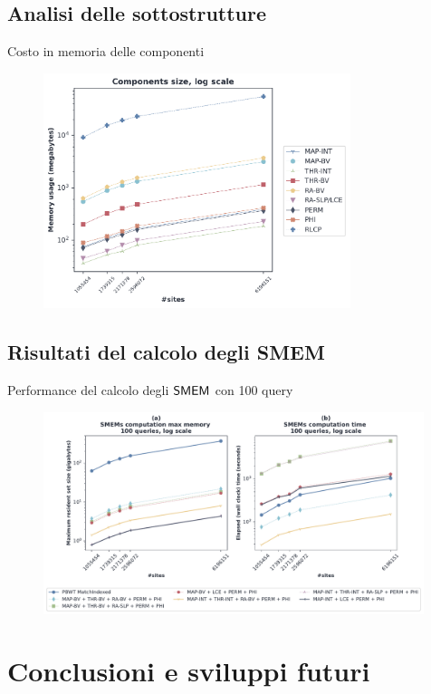 \documentclass[]{beamer}
\def\SMEM{\mbox{\rm {\sf SMEM}}}
\begin{document}
\subsection{Analisi delle sottostrutture}
\begin{frame}{Costo in memoria delle componenti}
  \begin{figure}[H]
    \centering
    \includegraphics[width=0.8\textwidth]{img/comp_mem22.pdf}
  \end{figure}
\end{frame}
\subsection{Risultati del calcolo degli SMEM}
\begin{frame}{Performance del calcolo degli $\SMEM$ con 100 query}
  \begin{figure}[H]
    \centering
    \includegraphics[width=0.99\textwidth]{img/exe_time_mem_paper2.pdf}
  \end{figure}
\end{frame}

\section{Conclusioni e sviluppi futuri}
\end{document}
